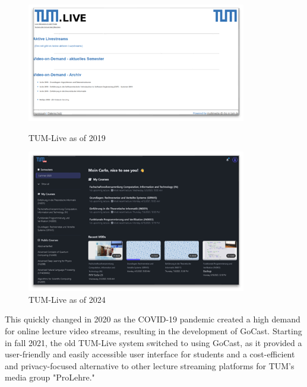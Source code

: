 \begin{figure}[htpb]
    \centering
    \begin{minipage}{0.49\linewidth}
        \centering
        \includegraphics[width=\linewidth]{images/TUMLive2019.png}
        \caption[TUM-Live as of 2019]{TUM-Live as of 2019\footnotemark[9]}
        \label{fig:tumlive-2019}
    \end{minipage}
    \hfill
    \begin{minipage}{0.49\linewidth}
        \centering
        \includegraphics[width=\linewidth]{images/TUMLive2024.png}
        \caption[TUM-Live as of 2024]{TUM-Live as of 2024\footnotemark[10]}
        \label{fig:tumlive-2024}
    \end{minipage}
\end{figure}

This quickly changed in 2020 as the COVID-19 pandemic created a high demand for online lecture video streams, resulting in the development of GoCast. Starting in fall 2021, the old TUM-Live system switched to using GoCast, as it provided a user-friendly and easily accessible user interface for students and a cost-efficient and privacy-focused alternative to other lecture streaming platforms for \ac{TUM}'s media group "ProLehre." 

